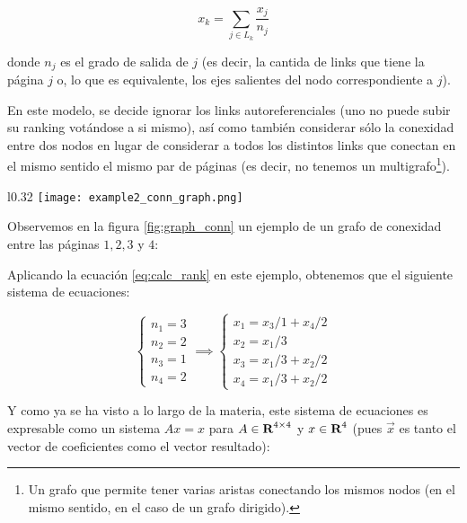 \begin{equation}\label{eq:calc_rank}
    x_k = \sum_{j\in L_k} \dfrac{x_j}{n_j} 
\end{equation}

donde $n_j$ es el grado de salida de $j$ (es decir, la cantida de links que
tiene la p\'agina $j$ o, lo que es equivalente, los ejes salientes del nodo
correspondiente a $j$).

\par En este modelo, se decide ignorar los links autoreferenciales (uno no puede
subir su ranking vot\'andose a si mismo), as\'i como tambi\'en considerar s\'olo
la conexidad entre dos nodos en lugar de considerar a todos los distintos links
que conectan en el mismo sentido el mismo par de p\'aginas (es decir, no
tenemos un multigrafo\footnote{Un grafo que permite tener varias aristas
conectando los mismos nodos (en el mismo sentido, en el caso de un grafo
dirigido).}).

\begin{wrapfigure}[12]{l}{0.32\textwidth}
    \texttt{[image: example2\_conn\_graph.png]}
    \caption{Grafo de conexidad}
    \label{fig:graph_conn}
\end{wrapfigure}
\noindent

\par Observemos en la figura \ref{fig:graph_conn} un ejemplo de un grafo de
conexidad entre las p\'aginas $1, 2, 3$ y $4$:

\par Aplicando la ecuaci\'on \ref{eq:calc_rank} en este ejemplo, obtenemos que
el siguiente sistema de ecuaciones:

\begin{equation}
    \begin{cases}
        n_1 = 3\\
        n_2 = 2\\
        n_3 = 1\\
        n_4 = 2
    \end{cases}
    \implies
    \begin{cases}
        x_1 = x_3/1 + x_4/2\\
        x_2 = x_1/3\\
        x_3 = x_1/3 + x_2/2\\
        x_4 = x_1/3 + x_2/2
    \end{cases}
\end{equation}

\par Y como ya se ha visto a lo largo de la materia, este sistema de ecuaciones
es expresable como un sistema $Ax = x$ para $A\in\hbox{\bf R}^{4\times4}$ y
$x\in\hbox{\bf R}^4 $ (pues $\overrightarrow{x}$ es tanto el vector de coeficientes
como el vector resultado):

